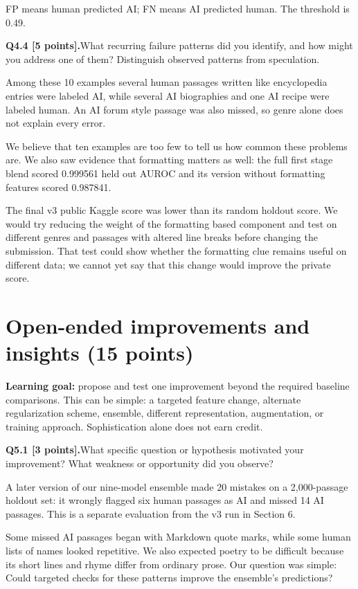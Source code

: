 \documentclass[11pt,letterpaper]{article}
\newcommand{\question}[2]{\needspace{4\baselineskip}\par\addvspace{0.45em}\noindent\textbf{#1}\quad #2\par\nobreak\vspace{0.1em}}
\newcommand{\smallnote}[1]{{\small\color{muted}#1}}
\begin{document}
\smallnote{FP means human predicted AI; FN means AI predicted human. The threshold is 0.49.}
\question{Q4.4 [5 points].}{What recurring failure patterns did you identify, and how might you address one of them? Distinguish observed patterns from speculation.}
Among these 10 examples several human passages written like encyclopedia entries were labeled AI, while several AI biographies and one AI recipe were labeled human. An AI forum style passage was also missed, so genre alone does not explain every error.
\newline

We believe that ten examples are too few to tell us how common these problems are. We also saw evidence that formatting matters as well: the full first stage blend scored 0.999561 held out AUROC and its version without formatting features scored 0.987841.
\newline

The final v3 public Kaggle score was lower than its random holdout score. We would try reducing the weight of the formatting based component and test on different genres and passages with altered line breaks before changing the submission. That test could show whether the formatting clue remains useful on different data; we cannot yet say that this change would improve the private score.
\newpage
\section{Open-ended improvements and insights (15 points)}
\textbf{Learning goal:} propose and test one improvement beyond the required baseline comparisons. This can be simple: a targeted feature change, alternate regularization scheme, ensemble, different representation, augmentation, or training approach. Sophistication alone does not earn credit.

\question{Q5.1 [3 points].}{What specific question or hypothesis motivated your improvement? What weakness or opportunity did you observe?}
A later version of our nine-model ensemble made 20 mistakes on a 2,000-passage holdout set: it wrongly flagged six human passages as AI and missed 14 AI passages. This is a separate evaluation from the v3 run in Section 6.
\newline

Some missed AI passages began with Markdown quote marks, while some human lists of names looked repetitive. We also expected poetry to be difficult because its short lines and rhyme differ from ordinary prose. Our question was simple: Could targeted checks for these patterns improve the ensemble's predictions?
\end{document}
